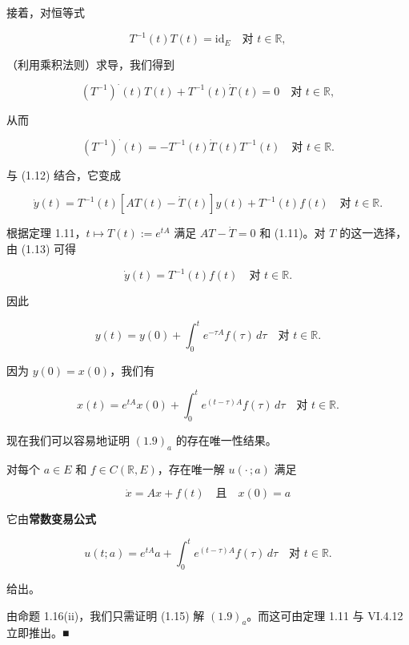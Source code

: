 接着，对恒等式

\[
T^{-1}(t)T(t) = \mathrm{id}_{E} \quad \text{对 } t \in \mathbb{R} ,
\]

（利用乘积法则）求导，我们得到

\[
(T^{-1})^{\cdot}(t)T(t) + T^{-1}(t)\dot{T}(t) = 0 \quad \text{对 } t \in \mathbb{R} ,
\]

从而

\[
(T^{-1})^{\cdot}(t) = -T^{-1}(t)\dot{T}(t)T^{-1}(t) \quad \text{对 } t \in \mathbb{R} .
\]

与 (1.12) 结合，它变成

\begin{equation}
\dot{y}(t) = T^{-1}(t)\left[AT(t) - \dot{T}(t)\right]y(t) + T^{-1}(t)f(t) \quad \text{对 } t \in \mathbb{R} .\tag{1.13}
\end{equation}

根据定理 1.11，$ t \mapsto T(t) := e^{tA} $ 满足 $ AT - \dot{T} = 0 $ 和 (1.11)。对 $ T $ 的这一选择，由 (1.13) 可得

\[
\dot{y}(t) = T^{-1}(t)f(t) \quad \text{对 } t \in \mathbb{R} .
\]

因此

\[
y(t) = y(0) + \int_{0}^{t}e^{-\tau A}f(\tau)\,d\tau \quad \text{对 } t \in \mathbb{R} .
\]

因为 $ y(0) = x(0) $，我们有

\begin{equation}
x(t) = e^{tA}x(0) + \int_{0}^{t}e^{(t-\tau)A}f(\tau)\,d\tau \quad \text{对 } t \in \mathbb{R} .\tag{1.14}
\end{equation}

现在我们可以容易地证明 $ (1.9)_{a} $ 的存在唯一性结果。

\begin{theorem}

对每个 $ a \in E $ 和 $ f \in C(\mathbb{R}, E) $，存在唯一解 $ u(\cdot\,;a) $ 满足

\[
\dot{x} = Ax + f(t) \quad \text{且} \quad x(0) = a
\]

它由\textbf{常数变易公式}

\begin{equation}
u(t;a) = e^{tA}a + \int_{0}^{t}e^{(t-\tau)A}f(\tau)\,d\tau \quad \text{对 } t \in \mathbb{R} .\tag{1.15}
\end{equation}

给出。

\proofhead
由命题 1.16(ii)，我们只需证明 (1.15) 解 $ (1.9)_{a} $。而这可由定理 1.11 与 VI.4.12 立即推出。\nobreak\hspace{0.35em}■
\end{theorem}

